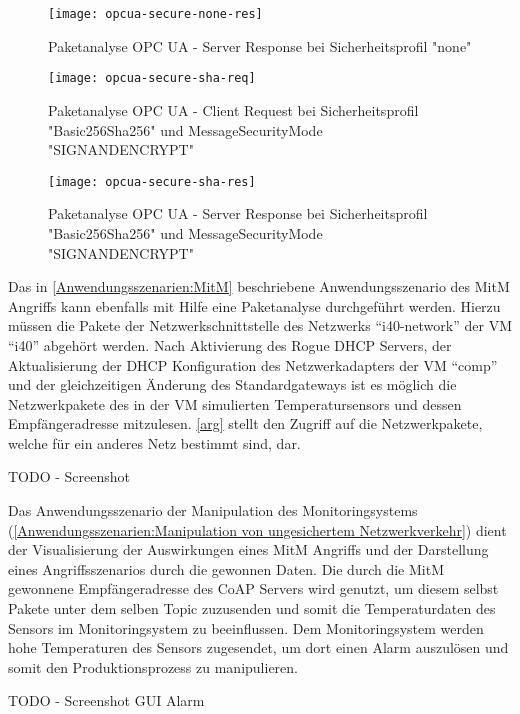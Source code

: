 \begin{figure}[h]
  \centering
  \texttt{[image: opcua-secure-none-res]}
  \caption{Paketanalyse OPC UA - Server Response bei Sicherheitsprofil "none"} 
  \label{Analyse:opcua-secure-none-res}
\end{figure}

\begin{figure}[h]
  \centering
  \texttt{[image: opcua-secure-sha-req]}
  \caption{Paketanalyse OPC UA - Client Request bei Sicherheitsprofil "Basic256Sha256" und MessageSecurityMode "SIGNANDENCRYPT"} 
  \label{Analyse:opcua-secure-sha-req}
\end{figure}

\begin{figure}[h]
  \centering
  \texttt{[image: opcua-secure-sha-res]}
  \caption{Paketanalyse OPC UA - Server Response bei Sicherheitsprofil "Basic256Sha256" und MessageSecurityMode "SIGNANDENCRYPT"} 
  \label{Analyse:opcua-secure-sha-res}
\end{figure}

Das in \autoref{Anwendungsszenarien:MitM} beschriebene Anwendungsszenario des \ac{MitM} Angriffs kann ebenfalls mit Hilfe eine Paketanalyse durchgeführt werden. Hierzu müssen die Pakete der Netzwerkschnittstelle des Netzwerks "`i40-network"' der \ac{VM} "`i40"' abgehört werden. Nach Aktivierung des Rogue \ac{DHCP} Servers, der Aktualisierung der \ac{DHCP} Konfiguration des Netzwerkadapters der \ac{VM} "`comp"' und der gleichzeitigen Änderung des Standardgateways ist es möglich die Netzwerkpakete des in der \ac{VM} simulierten Temperatursensors und dessen Empfängeradresse mitzulesen. \autoref{arg} stellt den Zugriff auf die Netzwerkpakete, welche für ein anderes Netz bestimmt sind, dar.

TODO - Screenshot

Das Anwendungsszenario der Manipulation des Monitoringsystems (\autoref{Anwendungsszenarien:Manipulation von ungesichertem Netzwerkverkehr}) dient der Visualisierung der Auswirkungen eines \ac{MitM} Angriffs und der Darstellung eines Angriffsszenarios durch die gewonnen Daten. Die durch die \ac{MitM} gewonnene Empfängeradresse des \ac{CoAP} Servers wird genutzt, um diesem selbst Pakete unter dem selben Topic zuzusenden und somit die Temperaturdaten des Sensors im Monitoringsystem zu beeinflussen. Dem Monitoringsystem werden hohe Temperaturen des Sensors zugesendet, um dort einen Alarm auszulösen und somit den Produktionsprozess zu manipulieren.

TODO - Screenshot GUI Alarm